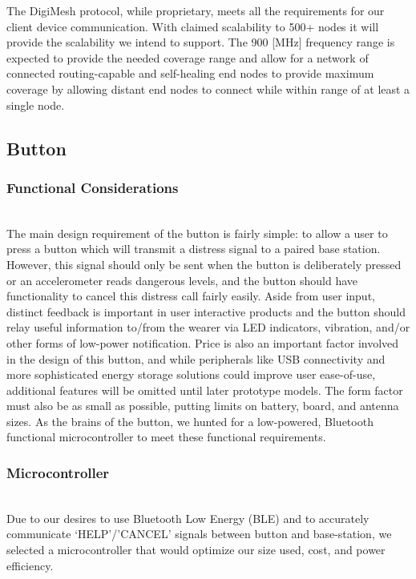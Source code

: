 \documentclass[journal]{IEEEtran}
\begin{document}
\noindent The DigiMesh protocol, while proprietary, meets all the requirements for our client device communication.  With claimed scalability to 500+ nodes it will provide the scalability we intend to support.  The 900 [MHz] frequency range is expected to provide the needed coverage range and allow for a network of connected routing-capable and self-healing end nodes to provide maximum coverage  by allowing distant end nodes to connect while within range of at least a single node.

\subsection{Button}

\subsubsection{Functional Considerations}
\noindent \\ The main design requirement of the button is fairly simple: to allow a user to press a button which will transmit a distress signal to a paired base station.  However, this signal should only be sent when the button is deliberately pressed or an accelerometer reads dangerous levels, and the button should have functionality to cancel this distress call fairly easily.  Aside from user input, distinct feedback is important in user interactive products and the button should relay useful information to/from the wearer via LED indicators, vibration, and/or other forms of low-power notification.  Price is also an important factor involved in the design of this button, and while peripherals like USB connectivity and more sophisticated energy storage solutions could improve user ease-of-use, additional features will be omitted until later prototype models.  The form factor must also be as small as possible, putting limits on battery, board, and antenna sizes.  As the brains of the button, we hunted for a low-powered, Bluetooth functional microcontroller to meet these functional requirements.\\

\subsubsection{Microcontroller}
\noindent \\ Due to our desires to use Bluetooth Low Energy (BLE) and to accurately communicate ‘HELP’/’CANCEL’ signals between button and base-station, we selected a microcontroller that would optimize our size used, cost, and power efficiency.
\end{document}

